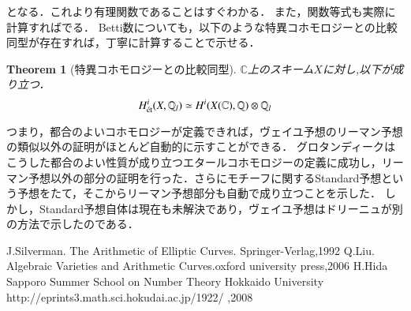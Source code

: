 \documentclass{ujarticle}
\newtheorem{thm}{Theorem}[section]
\def\r#1{\text{\rm #1}}
\newcommand{\et}{\r{\'et}}
\begin{document}
となる．これより有理関数であることはすぐわかる．
また，関数等式も実際に計算すればでる．
Betti数についても，以下のような特異コホモロジーとの比較同型が存在すれば，丁寧に計算することで示せる．
\begin{thm}[特異コホモロジーとの比較同型]
$\mathbb{C}$上のスキーム$X$に対し,以下が成り立つ．
\begin{equation*}
 H^i_{\et}(X,\mathbb{Q}_l) \simeq H^i(X(\mathbb{C}),\mathbb{Q})\otimes \mathbb{Q}_l
\end{equation*}
\end{thm}
つまり，都合のよいコホモロジーが定義できれば，ヴェイユ予想のリーマン予想の類似以外の証明がほとんど自動的に示すことができる．
グロタンディークはこうした都合のよい性質が成り立つエタールコホモロジーの定義に成功し，リーマン予想以外の部分の証明を行った．さらにモチーフに関するStandard予想という予想をたて，そこからリーマン予想部分も自動で成り立つことを示した．
しかし，Standard予想自体は現在も未解決であり，ヴェイユ予想はドリーニュが別の方法で示したのである．

\begin{thebibliography}{数字}
 J.Silverman. The Arithmetic of Elliptic Curves. Springer-Verlag,1992
 Q.Liu. Algebraic Varieties and Arithmetic Curves.oxford university press,2006
 H.Hida Sapporo Summer School on Number Theory Hokkaido University http://eprints3.math.sci.hokudai.ac.jp/1922/ ,2008
\end{thebibliography}
\end{document}
